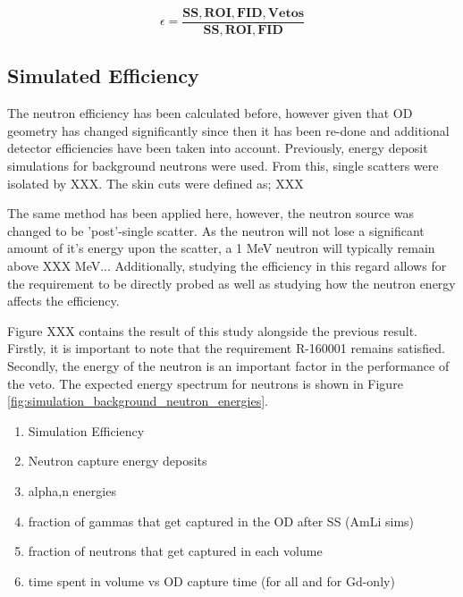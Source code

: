 \begin{equation}
    \epsilon = \frac{\mathbf{SS, ROI, FID, Vetos}}{\mathbf{SS, ROI, FID}}
    \label{eq:neutron_efficiency}
\end{equation}


\subsection{Simulated Efficiency}
\par
The neutron efficiency has been calculated before, however given that OD geometry has changed significantly since then it has been re-done and additional detector efficiencies have been taken into account.
Previously, energy deposit simulations for background neutrons were used. 
From this, single scatters were isolated by XXX.
The skin cuts were defined as; XXX


\par
The same method has been applied here, however, the neutron source was changed to be 'post'-single scatter. 
As the neutron will not lose a significant amount of it's energy upon the scatter, a 1 MeV neutron will typically remain above XXX MeV...
Additionally, studying the efficiency in this regard allows for the requirement to be directly probed as well as studying how the neutron energy affects the efficiency.

\par
Figure XXX contains the result of this study alongside the previous result.
Firstly, it is important to note that the requirement R-160001 remains satisfied.
Secondly, the energy of the neutron is an important factor in the performance of the veto.
The expected energy spectrum for neutrons is shown in Figure \ref{fig:simulation_background_neutron_energies}.


\begin{tcolorbox}[colback=red!5!white, colframe=red!50!black, title=Key Plots]
\begin{enumerate}
    \item Simulation Efficiency
    \item Neutron capture energy deposits
    \item alpha,n energies
    \item fraction of gammas that get captured in the OD after SS (AmLi sims)
    \item fraction of neutrons that get captured in each volume
    \item time spent in volume vs OD capture time (for all and for Gd-only)
\end{enumerate}
\end{tcolorbox}

